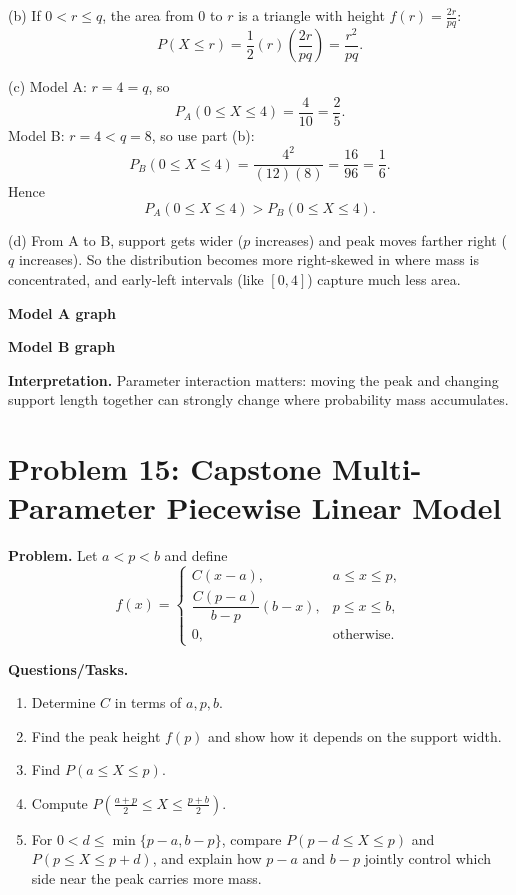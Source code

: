 (b) If $0<r\le q$, the area from $0$ to $r$ is a triangle with height $f(r)=\frac{2r}{pq}$:
\[
P(X\le r)=\frac12(r)\left(\frac{2r}{pq}\right)=\frac{r^2}{pq}.
\]

(c) Model A: $r=4=q$, so
\[
P_A(0\le X\le 4)=\frac{4}{10}=\frac25.
\]
Model B: $r=4<q=8$, so use part (b):
\[
P_B(0\le X\le 4)=\frac{4^2}{(12)(8)}=\frac{16}{96}=\frac16.
\]
Hence
\[
P_A(0\le X\le 4)>P_B(0\le X\le 4).
\]

(d) From A to B, support gets wider ($p$ increases) and peak moves farther right ($q$ increases). So the distribution becomes more right-skewed in where mass is concentrated, and early-left intervals (like $[0,4]$) capture much less area.

\textbf{Model A graph}

\textbf{Model B graph}

\textbf{Interpretation.}
Parameter interaction matters: moving the peak and changing support length together can strongly change where probability mass accumulates.

\section{Problem 15: Capstone Multi-Parameter Piecewise Linear Model}

\textbf{Problem.}
Let $a<p<b$ and define
\[
f(x)=\begin{cases}
C(x-a), & a\le x\le p,\\
\dfrac{C(p-a)}{b-p}(b-x), & p\le x\le b,\\
0, & \text{otherwise.}
\end{cases}
\]

\textbf{Questions/Tasks.}
\begin{enumerate}
\item Determine $C$ in terms of $a,p,b$.
\item Find the peak height $f(p)$ and show how it depends on the support width.
\item Find $P(a\le X\le p)$.
\item Compute $P\!\left(\frac{a+p}{2}\le X\le\frac{p+b}{2}\right)$.
\item For $0<d\le\min\{p-a,b-p\}$, compare $P(p-d\le X\le p)$ and $P(p\le X\le p+d)$, and explain how $p-a$ and $b-p$ jointly control which side near the peak carries more mass.
\end{enumerate}

